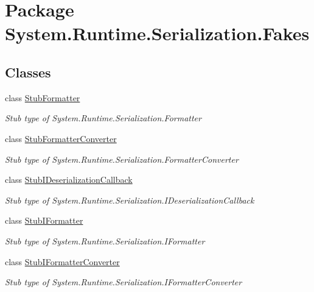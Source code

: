 \hypertarget{namespace_system_1_1_runtime_1_1_serialization_1_1_fakes}{\section{Package System.\-Runtime.\-Serialization.\-Fakes}
\label{namespace_system_1_1_runtime_1_1_serialization_1_1_fakes}
}
\subsection*{Classes}
\begin{DoxyCompactItemize}
\item 
class \hyperlink{class_system_1_1_runtime_1_1_serialization_1_1_fakes_1_1_stub_formatter}{Stub\-Formatter}
\begin{DoxyCompactList}\small\item\em Stub type of System.\-Runtime.\-Serialization.\-Formatter\end{DoxyCompactList}\item 
class \hyperlink{class_system_1_1_runtime_1_1_serialization_1_1_fakes_1_1_stub_formatter_converter}{Stub\-Formatter\-Converter}
\begin{DoxyCompactList}\small\item\em Stub type of System.\-Runtime.\-Serialization.\-Formatter\-Converter\end{DoxyCompactList}\item 
class \hyperlink{class_system_1_1_runtime_1_1_serialization_1_1_fakes_1_1_stub_i_deserialization_callback}{Stub\-I\-Deserialization\-Callback}
\begin{DoxyCompactList}\small\item\em Stub type of System.\-Runtime.\-Serialization.\-I\-Deserialization\-Callback\end{DoxyCompactList}\item 
class \hyperlink{class_system_1_1_runtime_1_1_serialization_1_1_fakes_1_1_stub_i_formatter}{Stub\-I\-Formatter}
\begin{DoxyCompactList}\small\item\em Stub type of System.\-Runtime.\-Serialization.\-I\-Formatter\end{DoxyCompactList}\item 
class \hyperlink{class_system_1_1_runtime_1_1_serialization_1_1_fakes_1_1_stub_i_formatter_converter}{Stub\-I\-Formatter\-Converter}
\begin{DoxyCompactList}\small\item\em Stub type of System.\-Runtime.\-Serialization.\-I\-Formatter\-Converter\end{DoxyCompactList}\item 

\end{DoxyCompactItemize}

